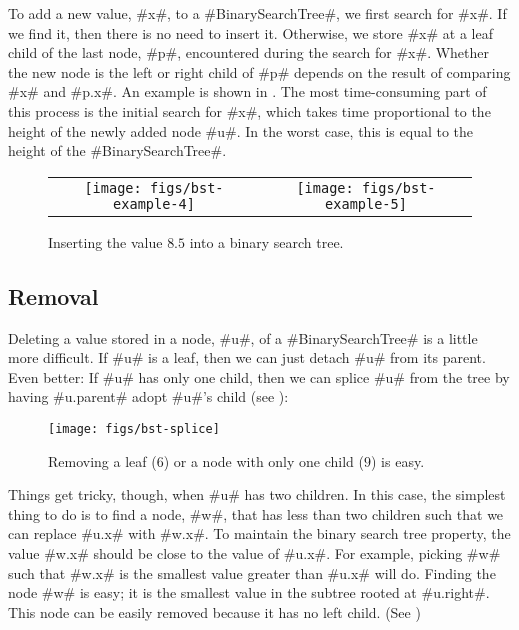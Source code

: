 To add a new value, #x#, to a #BinarySearchTree#, we first search for
#x#. If we find it, then there is no need to insert it.  Otherwise,
we store #x# at a leaf child of the last node, #p#, encountered during the
search for #x#. Whether the new node is the left or right child of #p# depends on the result of comparing #x# and #p.x#.
An example is shown in . The most time-consuming
part of this process is the initial search for #x#, which takes time
proportional to the height of the newly added node #u#.  In the worst
case, this is equal to the height of the #BinarySearchTree#.

\begin{figure}
  \begin{center}
    \begin{tabular}{cc}
    \texttt{[image: figs/bst-example-4]} &
    \texttt{[image: figs/bst-example-5]} 
    \end{tabular}
  \end{center}
  \caption{Inserting the value $8.5$ into a binary search tree.}
\end{figure}


\subsection{Removal}

Deleting a value stored in a node, #u#, of a #BinarySearchTree# is a
little more difficult.  If #u# is a leaf, then we can just detach #u#
from its parent.  Even better: If #u# has only one child, then we can
splice #u# from the tree by having #u.parent# adopt #u#'s child (see
):

\begin{figure}
  \begin{center}
    \texttt{[image: figs/bst-splice]}
  \end{center}
  \caption{Removing a leaf ($6$) or a node with only one child ($9$) is easy.}
\end{figure}

Things get tricky, though, when #u# has two children.  In this case,
the simplest thing to do is to find a node, #w#, that has less than
two children such that we can replace #u.x# with #w.x#.  To maintain
the binary search tree property, the value #w.x# should be close to the
value of #u.x#.  For example, picking #w# such that #w.x# is the smallest
value greater than #u.x# will do.  Finding the node #w# is easy; it is
the smallest value in the subtree rooted at #u.right#.  This node can
be easily removed because it has no left child.  (See )

